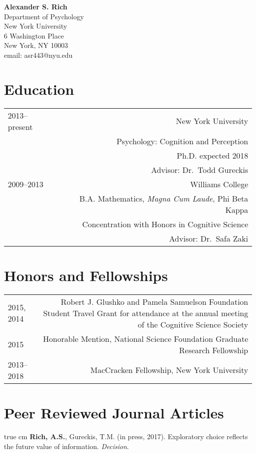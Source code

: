 \documentclass[12pt]{my_cv}
\def\ind{\hangindent=1 true cm\hangafter=1 \noindent}
\begin{document}
\noindent \textbf{\sffamily\Large Alexander S. Rich}\vspace{1em}\\
Department of Psychology\\
New York University\\
6 Washington Place\\
 New York, NY 10003\\
email: asr443@nyu.edu\\

\section{Education}
\begin{tabular}{L R}
2013--present&New York University\\
&Psychology: Cognition and Perception\\
&Ph.D. expected 2018\\
&Advisor: Dr.\ Todd Gureckis \vspace{1em}\\ 
2009--2013&Williams College\\
&B.A. Mathematics, \emph{Magna Cum Laude}, Phi Beta Kappa\\
&Concentration with Honors in Cognitive Science\\
&Advisor: Dr.\ Safa Zaki\\
\end{tabular}

\section{Honors and Fellowships}
\begin{tabular}{L R}
2015, 2014&Robert J. Glushko and Pamela Samuelson Foundation Student Travel Grant for attendance at the annual meeting of the Cognitive Science Society\\[1ex]
2015&Honorable Mention, National Science Foundation Graduate Research Fellowship\\[1ex]
2013--2018&MacCracken Fellowship, New York University\\
\end{tabular}

\section{Peer Reviewed Journal Articles}

\ind \textbf{Rich, A.S.}, Gureckis, T.M. (in press, 2017). Exploratory choice
reflects the future value of information. \emph{Decision}.
\end{document}

